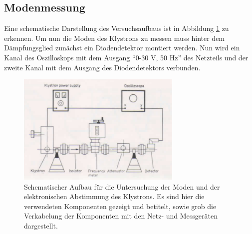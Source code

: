 

        \subsection{Modenmessung}
        Eine schematische Darstellung des Versuchsaufbaus ist in Abbildung \ref{fig:3} zu erkennen.
        Um nun die Moden des Klystrons zu messen muss hinter dem Dämpfungsglied zunächst ein Diodendetektor montiert werden.
        Nun wird ein Kanal des Oszilloskops mit dem Ausgang \enquote{0-30 V, 50 Hz} des Netzteils und der zweite Kanal mit dem Ausgang des Diodendetektors verbunden.
        \begin{figure}[H]
            \centering
            \includegraphics[width=0.7\textwidth]{pics/v53_1.png}
            \caption{Schematischer Aufbau für die Untersuchung der Moden und der elektronischen Abstimmung des Klystrons. Es sind hier die verwendeten Komponenten gezeigt und betitelt, sowie grob die Verkabelung der Komponenten mit den Netz- und Messgeräten dargestellt.\cite{Mikro}}
            \label{fig:3}
        \end{figure}

